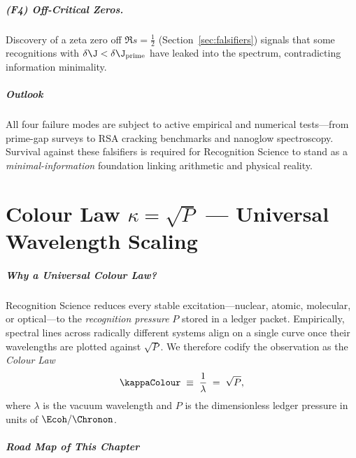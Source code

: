 \documentclass[11pt,oneside]{book}
\begin{document}
{\paragraph{(F4) Off-Critical Zeros.}
Discovery of a zeta zero off $\Re s=\tfrac12$
(Section~\ref{sec:falsifiers}) signals that
some recognitions with $\delta\J<\delta\J_{\rm prime}$
have leaked into the spectrum, contradicting information minimality.

\paragraph*{Outlook}

All four failure modes are subject to active empirical and numerical
tests—from prime-gap surveys to RSA cracking benchmarks and nanoglow
spectroscopy.  Survival against these falsifiers is required for
Recognition Science to stand as a \emph{minimal-information} foundation
linking arithmetic and physical reality.

\chapter{Colour Law $\kappa = \sqrt{P}$ — Universal Wavelength Scaling}
\label{sec:colour-law-intro}

\paragraph{Why a Universal Colour Law?}

Recognition Science reduces every stable excitation—nuclear, atomic,
molecular, or optical—to the \emph{recognition pressure}
$P$ stored in a ledger packet.
Empirically, spectral lines across radically different systems align
on a single curve once their wavelengths are plotted against
$\sqrt{P}$.
We therefore codify the observation as the \emph{Colour Law}
\[
   \kappaColour
   \;\equiv\;
   \frac{1}{\lambda}
   \;=\;
   \sqrt{P},
   \label{eq:kappa-law}
\]
where $\lambda$ is the vacuum wavelength and
$P$ is the dimensionless ledger pressure in units of $\Ecoh/\Chronon$.

\paragraph{Road Map of This Chapter}

}
\end{document}
